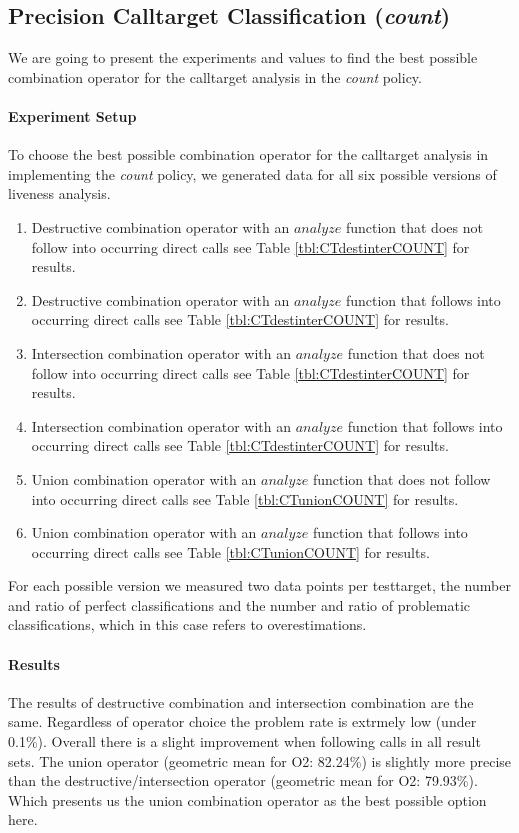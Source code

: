 \subsection{Precision Calltarget Classification (\textit{count})}
\label{subsection:typeshieldprecision}
We are going to present the experiments and values to find the best possible combination operator for the calltarget analysis in the \textit{count} policy.

\paragraph{Experiment Setup}
To choose the best possible combination operator for the calltarget analysis in implementing the \textit{count} policy, we generated data for all six possible versions of liveness analysis.
\begin{enumerate}
\item Destructive combination operator with an $analyze$ function that does not follow into occurring direct calls see Table \ref{tbl:CTdestinterCOUNT} for results.
\item Destructive combination operator with an $analyze$ function that follows into occurring direct calls see Table \ref{tbl:CTdestinterCOUNT} for results.
\item Intersection combination operator with an $analyze$ function that does not follow into occurring direct calls see Table \ref{tbl:CTdestinterCOUNT} for results.
\item Intersection combination operator with an $analyze$ function that follows into occurring direct calls see Table \ref{tbl:CTdestinterCOUNT} for results.
\item Union combination operator with an $analyze$ function that does not follow into occurring direct calls see Table \ref{tbl:CTunionCOUNT} for results.
\item Union combination operator with an $analyze$ function that follows into occurring direct calls see Table \ref{tbl:CTunionCOUNT} for results.
\end{enumerate}
For each possible version we measured two data points per testtarget, the number and ratio of perfect classifications and the number and ratio of problematic classifications, which in this case refers to overestimations.
\paragraph{Results} The results of destructive combination and intersection combination are the same. Regardless of operator choice the problem rate is extrmely low (under 0.1\%). Overall there is a slight improvement when following calls in all result sets. The union operator (geometric mean for O2: 82.24\%) is slightly more precise than the destructive/intersection operator (geometric mean for O2: 79.93\%). Which presents us the union combination operator as the best possible option here.


